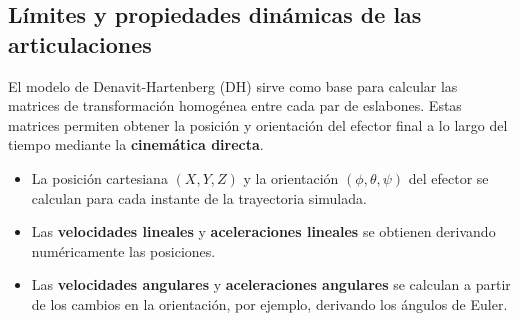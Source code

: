\subsection{Límites y propiedades dinámicas de las articulaciones} \label{subsec:limites_propiedades}

El modelo de Denavit-Hartenberg (DH) sirve como base para calcular las matrices de transformación homogénea entre cada par de eslabones. Estas matrices permiten obtener la posición y orientación del efector final a lo largo del tiempo mediante la \textbf{cinemática directa}.

\begin{itemize}
	\item La posición cartesiana $(X, Y, Z)$ y la orientación $(\phi, \theta, \psi)$ del efector se calculan para cada instante de la trayectoria simulada.
	\item Las \textbf{velocidades lineales} y \textbf{aceleraciones lineales} se obtienen derivando numéricamente las posiciones.
	\item Las \textbf{velocidades angulares} y \textbf{aceleraciones angulares} se calculan a partir de los cambios en la orientación, por ejemplo, derivando los ángulos de Euler.
\end{itemize}

\vspace{0.5em}